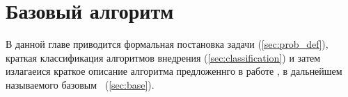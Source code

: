 \chapter{Базовый алгоритм}

В данной главе приводится формальная постановка задачи (\ref{sec:prob_def}), 
краткая классификация алгоритмов внедрения (\ref{sec:classification}) и затем
излагаеися краткое описание алгоритма предложеннго в работе \cite{Ohbuchi}, в дальнейшем называемого базовым~ 
(\ref{sec:base}).



